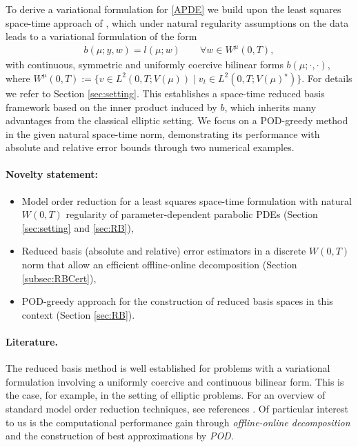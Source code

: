 \documentclass{article}
\theoremstyle{plain}
\theoremstyle{definition}
\theoremstyle{remark}
\begin{document}
To derive a variational formulation for \eqref{APDE} we build upon the least squares space-time approach of \cite{preprint_SP}, which under natural regularity assumptions on the data leads to a variational formulation of the form
\begin{align}
    b(\mu; y, w) = l(\mu; w) \qquad \forall w \in W^\mu(0,T),
\end{align}
with continuous, symmetric and uniformly coercive bilinear forms $b(\mu;\cdot,\cdot)$, where $W^\mu(0,T) := \lbrace v \in L^2(0,T;V(\mu)) \mid v_t \in L^2(0,T;V(\mu)^\star)\rbrace$. For details we refer to Section \ref{sec:setting}. 
This establishes a space-time reduced basis framework based on the inner product induced by $b$, which inherits many advantages from the classical elliptic setting.
We focus on a POD-greedy method in the given natural space-time norm, demonstrating its performance with absolute and relative error bounds through two numerical examples.


\paragraph*{Novelty statement:}
\begin{itemize}
    \item[$\blacktriangleright$] Model order reduction for a least squares space-time formulation with natural $W(0,T)$ regularity of parameter-dependent parabolic PDEs (Section \ref{sec:setting} and \ref{sec:RB}),
    \item[$\blacktriangleright$] Reduced basis (absolute and relative) error estimators in a discrete $W(0,T)$ norm that allow an efficient offline-online decomposition (Section \ref{subsec:RBCert}),
    \item[$\blacktriangleright$] POD-greedy approach for the construction of reduced basis spaces in this context (Section \ref{sec:RB}).
\end{itemize}

\paragraph*{Literature.} The reduced basis method is well established for problems with a variational formulation involving a uniformly coercive and continuous bilinear form. This is the case, for example, in the setting of elliptic problems. For an overview of standard model order reduction techniques, see references \cites{Hesthaven2016}{haasdonk2017reduced}{GräßleHinzeVolkwein+2021+47+96}{Hesthaven_Pagliantini_Rozza_2022}{Hinze2023RB}{Quarteroni2016}. Of particular interest to us is the computational performance gain through \textit{offline-online decomposition} and the construction of best approximations by \textit{POD}.\\
\end{document}
